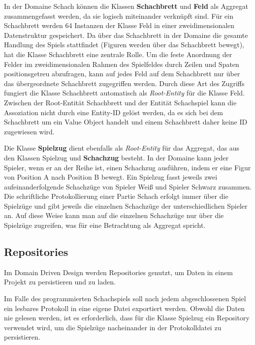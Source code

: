 In der Domaine \glqq Schach\grqq{} können die Klassen \textbf{Schachbrett} und \textbf{Feld} als Aggregat zusammengefasst werden, da sie logisch miteinander verknüpft sind. 
Für ein Schachbrett werden 64 Instanzen der Klasse Feld in einer zweidimensionalen Datenstruktur gespeichert. 
Da über das Schachbrett in der Domaine die gesamte Handlung des Spiels stattfindet (Figuren werden über das Schachbrett bewegt), hat die Klasse Schachbrett eine zentrale Rolle.
Um die feste Anordnung der Felder im zweidimensionalen Rahmen des Spielfeldes durch Zeilen und Spaten positionsgetreu abzufragen, kann auf jedes Feld auf dem Schachbrett nur über das übergeordnete Schachbrett zugegriffen werden. 
Durch diese Art des Zugriffs fungiert die Klasse Schachbrett automatisch als \textit{Root-Entity} für die Klasse Feld.
Zwischen der Root-Entität Schachbrett und der Entität Schachspiel kann die Assoziation nicht durch eine Entity-ID gelöst werden, da es sich bei dem Schachbrett um ein Value Object handelt und einem Schachbrett daher keine ID zugewiesen wird. 

Die Klasse \textbf{Spielzug} dient ebenfalls als \textit{Root-Entity} für das Aggregat, das aus den Klassen  Spielzug und \textbf{Schachzug} besteht. 
In der Domaine kann jeder Spieler, wenn er an der Reihe ist, einen Schachzug ausführen, indem er eine Figur von Position A nach Position B bewegt. 
Ein Spielzug fasst jeweils zwei aufeinanderfolgende Schachzüge von Spieler \glqq Weiß\grqq{} und Spieler \glqq Schwarz\grqq{} zusammen. 
Die schriftliche Protokollierung einer Partie Schach erfolgt immer über die Spielzüge und gibt jeweils die einzelnen Schachzüge der unterschiedlichen Spieler an. 
Auf diese Weise kann man auf die einzelnen Schachzüge nur über die Spielzüge zugreifen, was für eine Betrachtung als Aggregat spricht.  

\subsection{Repositories}

Im Domain Driven Design werden Repositories genutzt, um Daten in einem Projekt zu persistieren und zu laden. 

Im Falle des programmierten Schachspiels soll nach jedem abgeschlossenen Spiel ein lesbares Protokoll in eine eigene Datei exportiert werden.
Obwohl die Daten nie gelesen werden, ist es erforderlich, dass für die Klasse Spielzug ein Repository verwendet wird, um die Spielzüge nacheinander in der Protokolldatei zu persistieren. 

